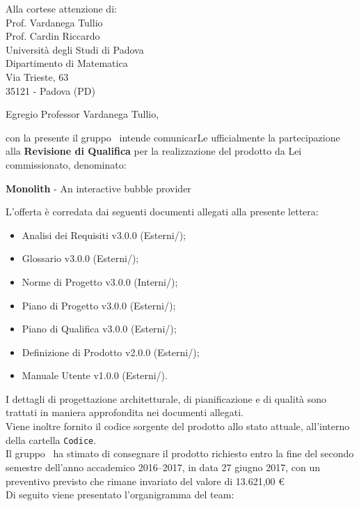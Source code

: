 

\newcommand{\logo}{../../Template/Logo/Logo.png}
\newcommand{\data}{\today}
\newcommand{\oggetto}{Partecipazione alla Revisione di Qualifica.}
\newcommand{\mittente}{Francesco Bazzerla \\ Responsabile NPE Developers}
\newcommand{\firma}{../../Template/Firme/FB.png}





\begin{letter}{Alla cortese attenzione di:  \\
 Prof. Vardanega Tullio \\
 Prof. Cardin Riccardo \\
 Università degli Studi di Padova \\
 Dipartimento di Matematica \\
 Via Trieste, 63 \\
 35121 - Padova (PD)}

\opening{Egregio Professor Vardanega Tullio,} 

con la presente il gruppo \gruppo\ intende comunicarLe ufficialmente la partecipazione alla \textbf{Revisione di Qualifica} per la realizzazione del prodotto da Lei commissionato, denominato:
\begin{center}
\textbf{Monolith} - An interactive bubble provider
\end{center}
L'offerta è corredata dai seguenti documenti allegati alla presente lettera:
\begin{itemize}
	\item Analisi dei Requisiti v3.0.0 (Esterni/\analisiDeiRequisiti);
	\item Glossario v3.0.0 (Esterni/\glossario);
	\item Norme di Progetto v3.0.0 (Interni/\normeDiProgetto);
	\item Piano di Progetto v3.0.0 (Esterni/\pianoDiProgetto);
	\item Piano di Qualifica v3.0.0 (Esterni/\pianoDiQualifica);
	\item Definizione di Prodotto v2.0.0 (Esterni/);
	\item Manuale Utente v1.0.0 (Esterni/\manualeUtente).
\end{itemize}

I dettagli di progettazione architetturale, di pianificazione e di qualità sono trattati in maniera approfondita nei documenti allegati. \\
Viene inoltre fornito il codice sorgente del prodotto allo stato attuale, all'interno della cartella \texttt{Codice}. \\
Il gruppo \gruppo\ ha stimato di consegnare il prodotto richiesto entro la fine del secondo semestre
dell'anno accademico 2016–2017, in data 27 giugno 2017, con un preventivo previsto che rimane invariato del valore di 13.621,00 \euro \\
Di seguito viene presentato l'organigramma del team:


\end{letter}
